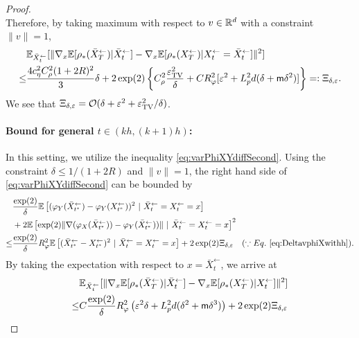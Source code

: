 \begin{proof}
$$$$
Therefore, by taking maximum with respect to $v \in {\mathbb{R}}^d$ with a constraint $\|v\| =1$, 
\begin{align}
& \mathbb{E}_{ \bar{X}_{t}^\leftarrow }[ \|\nabla_x \mathbb{E}[\rho_*(\bar{X}_{T}^\leftarrow) | \bar{X}_{t}^\leftarrow ] - \nabla_x \mathbb{E}[\rho_*({X}_{T}^\leftarrow) | {X}_{t}^\leftarrow =  \bar{X}_{t}^\leftarrow ]\|^2 ] \\
\leq & \frac{4 c_\eta^2  C_\rho^2 (1+2R)^2}{3}\delta  
+ 2 \exp(2)
\left\{ C_\rho^2\frac{\varepsilon_{\mathrm{TV}}^2}{\delta} + C R_\varphi^2  [\varepsilon^2 + L_p^2 d(\delta + \mathsf{m} \delta^2)]\right\} =: \Xi_{\delta,\varepsilon}.
\label{eq:DeltavphiXwithh}
\end{align}
We see that $\Xi_{\delta,\varepsilon} = {\mathcal{O}}(\delta + \varepsilon^2 + \varepsilon_{\mathrm{TV}}^2/\delta)$. 

\paragraph{Bound for general $t \in (kh,(k+1)h)$:} 
In this setting, we utilize the inequality \eqref{eq:varPhiXYdiffSecond}. 
Using the constraint $\delta \leq 1/(1 + 2R)$ and $\|v\|=1$, the right hand side of \eqref{eq:varPhiXYdiffSecond} can be bounded by 
\begin{align}
&   \frac{\exp(2)}{\delta}
\E\left[ (\varphi_Y( \bar{X}_{t^*}^\leftarrow) - \varphi_Y( {X}_{t^*}^\leftarrow))^2  ~|~ \bar{X}_{t}^\leftarrow = {X}_{t}^\leftarrow = x\right] \\
& + 2 \E\left[ \exp(2) \|\nabla (\varphi_X( \bar{X}_{t^*}^\leftarrow)) - \varphi_Y( \bar{X}_{t^*}^\leftarrow))\|  ~|~ \bar{X}_{t}^\leftarrow = {X}_{t}^\leftarrow = x\right]^2 \\ 
\leq & 
\frac{\exp(2)}{\delta} 
R_\varphi^2 \E\left[ (\bar{X}_{t^*}^\leftarrow -  {X}_{t^*}^\leftarrow)^2  ~|~ \bar{X}_{t}^\leftarrow = {X}_{t}^\leftarrow = x\right]
+ 2 \exp(2) \Xi_{\delta,\varepsilon}~~~(\because \Eqref{eq:DeltavphiXwithh}). 
\end{align}
By taking the expectation with respect to $x = \bar{X}_{t}^\leftarrow$, we arrive at 
\begin{align} 
& \E_{\bar{X}_{t}^\leftarrow}[ \|\nabla_x \E[\rho_*(\bar{X}_{T}^\leftarrow) |  \bar{X}_{t}^\leftarrow] 
-  \nabla_x \E[\rho_*({X}_{T}^\leftarrow) | {X}_{t}^\leftarrow] 
\|^2] \\
\leq & C \frac{\exp(2)}{\delta} 
R_\varphi^2 \left(\varepsilon^2 \delta  + \Lipdp^2 d(\delta^2 + \mathsf{m} \delta^3) \right)
+ 2 \exp(2) \Xi_{\delta,\varepsilon} \\

\end{align}
\end{proof}
